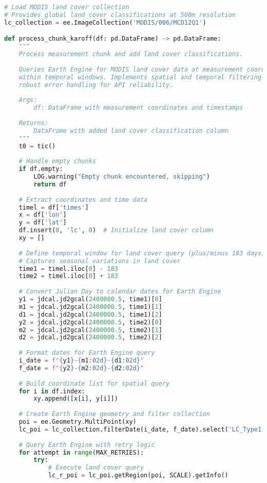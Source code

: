 \begin{lstlisting}[language=Python, caption=Land Cover Classification Addition Algorithm, label=alg:step02_add_lc, breaklines=true]
# Load MODIS land cover collection
# Provides global land cover classifications at 500m resolution
lc_collection = ee.ImageCollection('MODIS/006/MCD12Q1')

def process_chunk_karoff(df: pd.DataFrame) -> pd.DataFrame:
    """
    Process measurement chunk and add land cover classifications.
    
    Queries Earth Engine for MODIS land cover data at measurement coordinates
    within temporal windows. Implements spatial and temporal filtering with
    robust error handling for API reliability.
    
    Args:
        df: DataFrame with measurement coordinates and timestamps
        
    Returns:
        DataFrame with added land cover classification column
    """
    t0 = tic()
    
    # Handle empty chunks
    if df.empty:
        LOG.warning("Empty chunk encountered, skipping")
        return df
    
    # Extract coordinates and time data
    timel = df['times']
    x = df['lon']
    y = df['lat']
    df.insert(8, 'lc', 0)  # Initialize land cover column
    xy = []
    
    # Define temporal window for land cover query (plus/minus 183 days)
    # Captures seasonal variations in land cover
    time1 = timel.iloc[0] - 183
    time2 = timel.iloc[0] + 183
    
    # Convert Julian Day to calendar dates for Earth Engine
    y1 = jdcal.jd2gcal(2400000.5, time1)[0]
    m1 = jdcal.jd2gcal(2400000.5, time1)[1]
    d1 = jdcal.jd2gcal(2400000.5, time1)[2]
    y2 = jdcal.jd2gcal(2400000.5, time2)[0]
    m2 = jdcal.jd2gcal(2400000.5, time2)[1]
    d2 = jdcal.jd2gcal(2400000.5, time2)[2]
    
    # Format dates for Earth Engine query
    i_date = f"{y1}-{m1:02d}-{d1:02d}"
    f_date = f"{y2}-{m2:02d}-{d2:02d}"
    
    # Build coordinate list for spatial query
    for i in df.index:
        xy.append([x[i], y[i]])
    
    # Create Earth Engine geometry and filter collection
    poi = ee.Geometry.MultiPoint(xy)
    lc_poi = lc_collection.filterDate(i_date, f_date).select('LC_Type1')
    
    # Query Earth Engine with retry logic
    for attempt in range(MAX_RETRIES):
        try:
            # Execute land cover query
            lc_r_poi = lc_poi.getRegion(poi, SCALE).getInfo()
            

\end{lstlisting}
